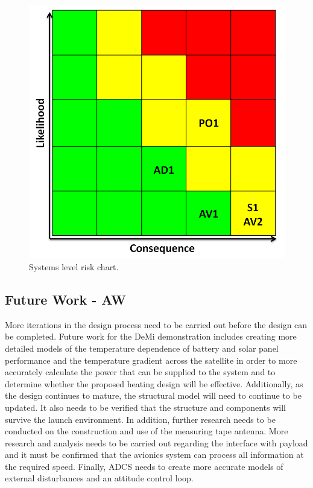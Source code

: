 \documentclass[12pt]{article}
\begin{document}
\begin{figure}[h]
\centering
\includegraphics{images/conclusion_1.png}
\caption{Systems level risk chart.}
\label{fig:risk_chart}
\end{figure}

		\subsection{Future Work - AW}

More iterations in the design process need to be carried out before the design can be completed.  Future work for the DeMi demonstration includes creating more detailed models of the temperature dependence of battery and solar panel performance and the temperature gradient across the satellite in order to more accurately calculate the power that can be supplied to the system and to determine whether the proposed heating design will be effective.  Additionally, as the design continues to mature, the structural model will need to continue to be updated.  It also needs to be verified that the structure and components will survive the launch environment. In addition, further research needs to be conducted on the construction and use of the measuring tape antenna.  More research and analysis needs to be carried out regarding the interface with payload and it must be confirmed that the avionics system can process all information at the required speed.  Finally, ADCS needs to create more accurate models of external disturbances and an attitude control loop.
\end{document}
